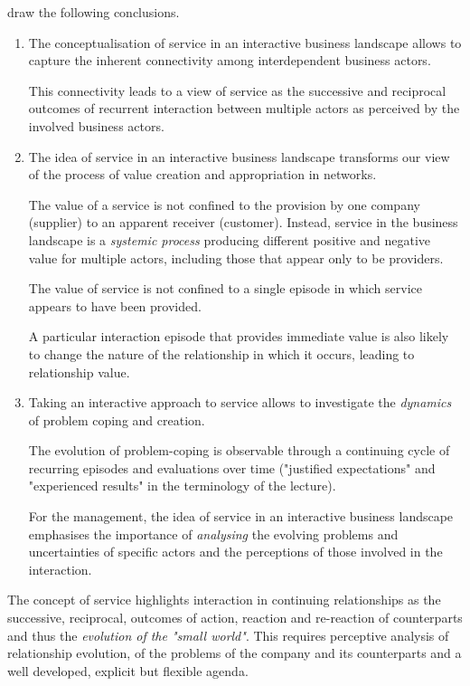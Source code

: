 \documentclass[11pt,a4paper]{article}
\begin{document}
\cite{} draw the following conclusions.
\begin{enumerate}
\item The conceptualisation of service in an interactive business landscape
  allows to capture the inherent connectivity among interdependent business
  actors.

  This connectivity leads to a view of service as the successive and
  reciprocal outcomes of recurrent interaction between multiple actors as
  perceived by the involved business actors.

\item The idea of service in an interactive business landscape transforms our
  view of the process of value creation and appropriation in networks.

  The value of a service is not conﬁned to the provision by one company
  (supplier) to an apparent receiver (customer).  Instead, service in the
  business landscape is a \emph{systemic process} producing different positive
  and negative value for multiple actors, including those that appear only to
  be providers.
  
  The value of service is not conﬁned to a single episode in which service
  appears to have been provided.

  A particular interaction episode that provides immediate value is also
  likely to change the nature of the relationship in which it occurs, leading
  to relationship value.

\item Taking an interactive approach to service allows to investigate the
  \emph{dynamics} of problem coping and creation.

  The evolution of problem-coping is observable through a continuing cycle of
  recurring episodes and evaluations over time ("justified expectations" and
  "experienced results" in the terminology of the lecture).

  For the management, the idea of service in an interactive business landscape
  emphasises the importance of \emph{analysing} the evolving problems and
  uncertainties of speciﬁc actors and the perceptions of those involved in the
  interaction.
\end{enumerate}

The concept of service highlights interaction in continuing relationships as
the successive, reciprocal, outcomes of action, reaction and re-reaction of
counterparts and thus the \emph{evolution of the "small world"}.  This
requires perceptive analysis of relationship evolution, of the problems of the
company and its counterparts and a well developed, explicit but ﬂexible
agenda.
\end{document}
